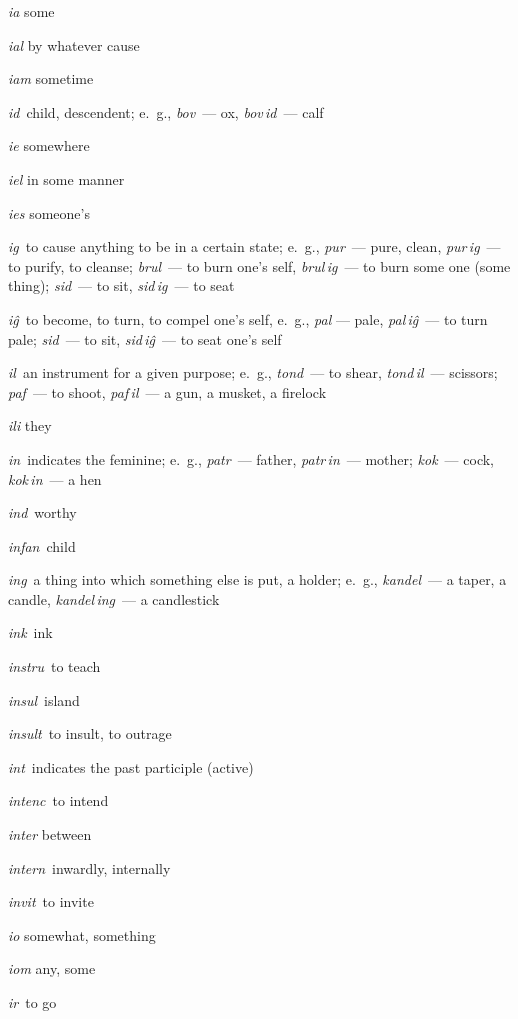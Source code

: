 \begin{landscape}
\begin{multicols}{5}
\begin{outdent}{1em}
\emph{ia} some

\emph{ial} by whatever cause

\emph{iam} sometime

\emph{id\,} child, descendent; e.~g., \emph{bov\,} — ox, \emph{bov\,id\,} — calf

\emph{ie} somewhere

\emph{iel} in some manner

\emph{ies} someone’s

\emph{ig\,} to cause anything to be in a certain state; e.~g., \emph{pur\,} — pure, clean, \emph{pur\,ig\,} — to purify, to cleanse; \emph{brul\,} — to burn one’s self, \emph{brul\,ig\,} — to burn some one (some thing); \emph{sid\,} — to sit, \emph{sid\,ig\,} — to seat

\emph{iĝ\,} to become, to turn, to compel one’s self, e.~g., \emph{pal} — pale, \emph{pal\,iĝ\,} — to turn pale; \emph{sid\,} — to sit, \emph{sid\,iĝ\,} — to seat one’s self

\emph{il\,} an instrument for a given purpose; e.~g., \emph{tond\,} — to shear, \emph{tond\,il\,} — scissors; \emph{paf\,} — to shoot, \emph{paf\,il\,} — a gun, a musket, a firelock

\emph{ili} they

\emph{in\,} indicates the feminine; e.~g., \emph{patr\,} — father, \emph{patr\,in\,} — mother; \emph{kok\,} — cock, \emph{kok\,in\,} — a hen

\emph{ind\,} worthy

\emph{infan\,} child

\emph{ing\,} a thing into which something else is put, a holder; e.~g., \emph{kandel\,} — a taper, a candle, \emph{kandel\,ing\,} — a candlestick

\emph{ink\,} ink

\emph{instru\,} to teach

\emph{insul\,} island

\emph{insult\,} to insult, to outrage

\emph{int\,} indicates the past participle (active)

\emph{intenc\,} to intend

\emph{inter} between

\emph{intern\,} inwardly, internally

\emph{invit\,} to invite

\emph{io} somewhat, something

\emph{iom} any, some

\emph{ir\,} to go


\end{outdent}
\end{multicols}
\end{landscape}

